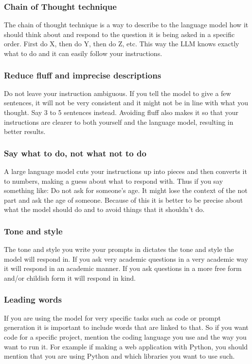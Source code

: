 \subsubsection*{Chain of Thought technique}
The chain of thought technique is a way to describe to the language model how it should think about and respond to the question it is being asked in a specific order. First do X, then do Y, then do Z, etc. This way the LLM knows exactly what to do and it can easily follow your instructions.
\subsubsection*{Reduce fluff and imprecise descriptions}
Do not leave your instruction ambiguous. If you tell the model to give a few sentences, it will not be very consistent and it might not be in line with what you thought. Say 3 to 5 sentences instead. Avoiding fluff also makes it so that your instructions are clearer to both yourself and the language model, resulting in better results.
\subsubsection*{Say what to do, not what not to do}
A large language model cuts your instructions up into pieces and then converts it to numbers, making a guess about what to respond with. Thus if you say something like: Do not ask for someone's age. It might lose the context of the not part and ask the age of someone. Because of this it is better to be precise about what the model should do and to avoid things that it shouldn't do.
\subsubsection*{Tone and style}
The tone and style you write your prompts in dictates the tone and style the model will respond in. If you ask very academic questions in a very academic way it will respond in an academic manner. If you ask questions in a more free form and/or childish form it will respond in kind.
\subsubsection*{Leading words}
If you are using the model for very specific tasks such as code or prompt generation it is important to include words that are linked to that. So if you want code for a specific project, mention the coding language you use and the way you want to run it. For example if making a web application with Python, you should mention that you are using Python and which libraries you want to use such.
